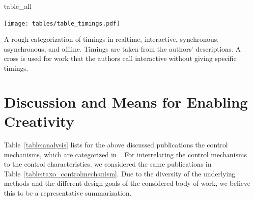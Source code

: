 
{table_all}


\begin{table}
    \centering
    \texttt{[image: tables/table\_timings.pdf]}
    \caption[Timings]{\label{table:timings} A rough categorization of timings in realtime, interactive, synchronous, asynchronous, and offline. Timings are taken from the authors' descriptions. A cross is used for work that the authors call interactive without giving specific timings.}
\end{table}


\section{Discussion and Means for Enabling Creativity}
\label{sec:discussion_creative_means}

Table~\ref{table:analysis} lists for the above discussed publications the control mechanisms, which are categorized in~.  For interrelating the control mechanisms to the control characteristics, we considered the same publications in Table~\ref{table:taxo_controlmechanism}. Due to the diversity of the underlying methods and the different design goals of the considered body of work, we believe this to be a representative summarization.


